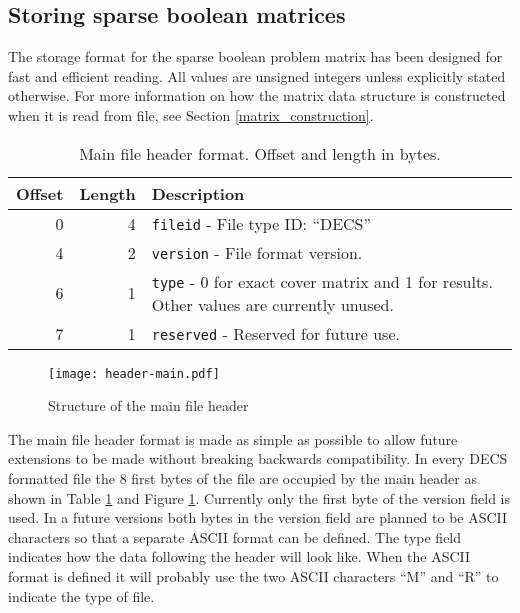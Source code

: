 \subsection{Storing sparse boolean matrices}

The storage format for the sparse boolean problem matrix has been designed for fast and efficient reading.
All values are unsigned integers unless explicitly stated otherwise.
For more information on how the matrix data structure is constructed when it is read from file, see Section \ref{matrix_construction}.

\begin{table}[tbp]
	\centering
	\begin{tabular}{|r|r|p{3.1in}|}
		\hline
		\bf Offset & \bf Length & \bf Description \\ \hline
		0  & 4 & \texttt{fileid} - File type ID: ``DECS'' \\ \hline
		4  & 2 & \texttt{version} - File format version. \\ \hline
		6  & 1 & \texttt{type} - 0 for exact cover matrix and 1 for results. Other values are currently unused. \\ \hline
		7  & 1 & \texttt{reserved} - Reserved for future use. \\ \hline
	\end{tabular}
	\caption{Main file header format. Offset and length in bytes.}
	\label{tab:header-main}
\end{table}

\begin{figure}[tbp]
	\centering
	\texttt{[image: header-main.pdf]}
	\caption{Structure of the main file header}
	\label{fig:header-main}
\end{figure}

The main file header format is made as simple as possible to allow future extensions to be made without breaking backwards compatibility.
In every DECS formatted file the 8 first bytes of the file are occupied by the main header as shown in Table \ref{tab:header-main} and Figure \ref{fig:header-main}.
Currently only the first byte of the version field is used.
In a future versions both bytes in the version field are planned to be ASCII characters so that a separate ASCII format can be defined.
The type field indicates how the data following the header will look like.
When the ASCII format is defined it will probably use the two ASCII characters ``M'' and ``R'' to indicate the type of file.



